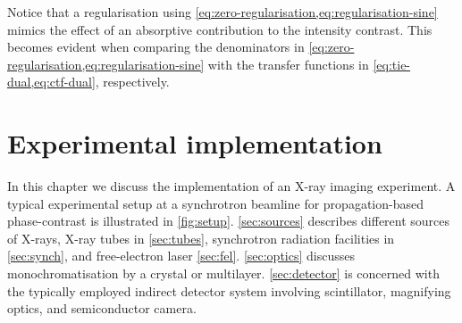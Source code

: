 \documentclass[
twoside,
openright,
titlepage,
numbers=noenddot,
headinclude,
fleqn,
a4paper,
footinclude=true,
cleardoublepage=empty,
abstractoff,
BCOR=5mm,
paper=a4,
fontsize=11pt,
british,ngerman,american,
]{scrreprt}
\begin{document}
Notice that a regularisation using
\cref{eq:zero-regularisation,eq:regularisation-sine} mimics the effect
of an absorptive contribution to the intensity contrast.  This becomes
evident when comparing the denominators in
\cref{eq:zero-regularisation,eq:regularisation-sine} with the transfer
functions in \cref{eq:tie-dual,eq:ctf-dual}, respectively.


\chapter{Experimental implementation}
\label{cha:exp}

In this chapter we discuss the implementation of an X-ray imaging
experiment.  A typical experimental setup at a synchrotron beamline
for propagation-based phase-contrast is illustrated in
\cref{fig:setup}.  \cref{sec:sources} describes different sources of
X-rays, \ie{} X-ray tubes in \cref{sec:tubes}, synchrotron radiation
facilities in \cref{sec:synch}, and free-electron laser
\cref{sec:fel}.  \cref{sec:optics} discusses monochromatisation by a
crystal or multilayer. \cref{sec:detector} is concerned with the
typically employed indirect detector system involving scintillator,
magnifying optics, and semiconductor camera.
\end{document}
